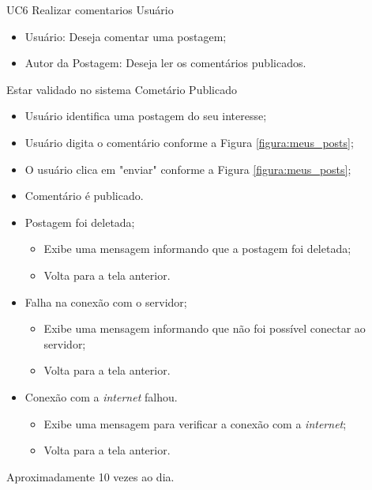 \casoDeUso
{UC6}
{Realizar comentarios}
{Usuário}
{
\begin{itemize}
	\item Usuário: Deseja comentar uma postagem;
	\item Autor da Postagem: Deseja ler os comentários publicados.
\end{itemize}

}
{Estar validado no sistema}
{Cometário Publicado}
{
\begin{itemize}
	\item Usuário identifica uma postagem do seu interesse;
	\item Usuário digita o comentário conforme a Figura \ref{figura:meus_posts};
	\item O usuário clica em "enviar" conforme a Figura \ref{figura:meus_posts};
	\item Comentário é publicado.
\end{itemize}
}
{
\begin{itemize}
	\item Postagem foi deletada;
	\begin{itemize}
		\item Exibe uma mensagem informando que a postagem foi deletada;
		\item Volta para a tela anterior.
	\end{itemize}
	
	\item Falha na conexão com o servidor;
	
	\begin{itemize}
		\item Exibe uma mensagem informando que não foi possível conectar ao servidor;
		\item Volta para a tela anterior.
	\end{itemize}
	
	\item Conexão com a \textit{internet} falhou.
	\begin{itemize}
		\item Exibe uma mensagem para verificar a conexão com a \textit{internet};
		\item Volta para a tela anterior.
	\end{itemize}

	
	
\end{itemize}
}
{Aproximadamente 10 vezes ao dia.}
{

}

